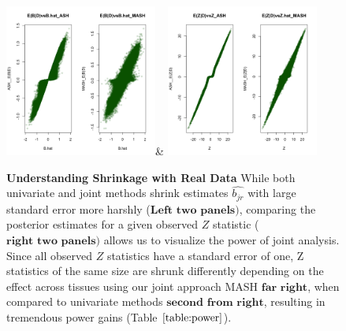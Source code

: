 \begin{figure}[htbp]
\includegraphics[width=5cm]{Figures/comparebeta.png}&
\includegraphics[width=5cm]{Figures/comparez.png}\\
\caption{\textbf{Understanding Shrinkage with Real Data} While both univariate and joint methods shrink estimates $\hat{b_{jr}}$ with large standard error more harshly ($\textbf{Left two panels)}$, comparing the posterior estimates for a given observed $Z$ statistic ($\textbf{right two panels)}$ allows us to visualize the power of joint analysis. Since all observed $Z$ statistics have a standard error of one, Z statistics of the same size are shrunk differently depending on  the effect across tissues using our joint approach MASH $\textbf{far right}$, when compared to univariate methods $\textbf{second from right}$, resulting in tremendous power gains (Table $\ref{table:power}$).}
\end{figure}\newline


